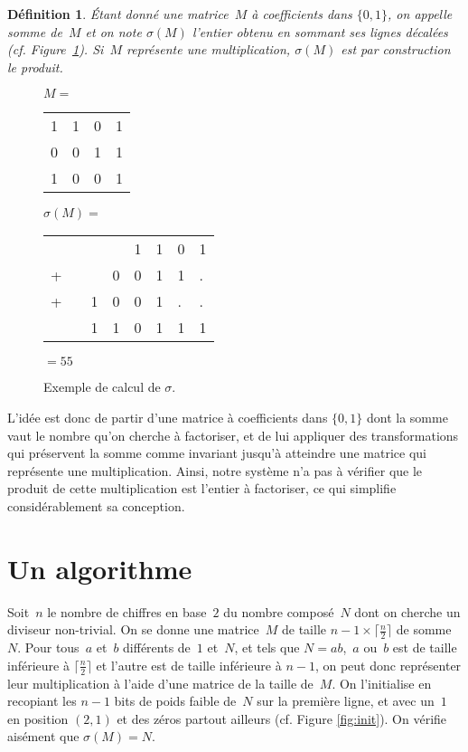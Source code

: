 \documentclass[11pt, openany, a4paper]{article}
\newtheorem*{df*}{ \textbf{Définition}}{}
\begin{document}
\begin{df*}
Étant donné une matrice~$M$ à coefficients dans $\{0,1\}$, on appelle \emph{somme} de~$M$ et on note $\sigma (M)$ l'entier obtenu en sommant ses lignes décalées (cf. Figure~\ref{fig:ExSigma}). Si~$M$ représente une multiplication, $\sigma(M)$ est par construction le produit. 
\end{df*}


\begin{figure}[]
\centering
\begin{minipage}[]{0.3\linewidth}
$M=$
\begin{tabular}{cccc}
1&1&0&1\\
0&0&1&1\\
1&0&0&1\\
\end{tabular}
\end{minipage}
\quad
\begin{minipage}[]{0.45\linewidth}
$\sigma(M)=$
\begin{tabular}{llllllll}
&&&&1&1&0&1\\
+&&&0&0&1&1&.\\
+&&1&0&0&1&.&.\\
\hline
&&1&1&0&1&1&1\\
\end{tabular}
$=55$
\end{minipage}
\caption{Exemple de calcul de $\sigma$.}
\label{fig:ExSigma}
\end{figure}

L'idée est donc de partir d'une matrice à coefficients dans $\{0,1\}$ dont la somme vaut le nombre qu'on cherche à factoriser, et de lui appliquer des transformations qui préservent la somme comme invariant jusqu'à atteindre une matrice qui représente une multiplication. Ainsi, notre système n'a pas à vérifier que le produit de cette multiplication est l'entier à factoriser, ce qui simplifie considérablement sa conception.

\section{Un algorithme}

Soit~$n$ le nombre de chiffres en base~$2$ du nombre composé~$N$ dont on cherche un diviseur non-trivial. On se donne une matrice~$M$ de taille $ n-1 \times \lceil \frac{n}{2}\rceil$ de somme~$N$. Pour tous~$a$ et~$b$ différents de~$1$ et~$N$, et tels que $N = ab$,~$a$ ou~$b$ est de taille inférieure à $\lceil\frac{n}{2}\rceil$ et l'autre est de taille inférieure à $n-1$, on peut donc représenter leur multiplication à l'aide d'une matrice de la taille de~$M$. On l'initialise en recopiant les $n-1$ bits de poids faible de~$N$ sur la première ligne, et avec un~$1$ en position $(2,1)$ et des zéros partout ailleurs (cf. Figure \ref{fig:init}). On vérifie aisément que $\sigma(M)=N$. 
\end{document}
